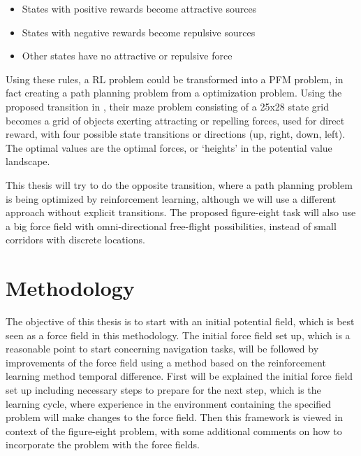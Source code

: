 \documentclass[11pt]{article}
\begin{document}
\begin{itemize}
 \item States with positive rewards become attractive sources
 \item States with negative rewards become repulsive sources
 \item Other states have no attractive or repulsive force
\end{itemize}

Using these rules, a RL problem could be transformed into a PFM problem, in fact creating a path planning problem from a optimization problem. Using the proposed transition in \cite{li-juan08}, their maze problem consisting of a 25x28 state grid becomes a grid of objects exerting attracting or repelling forces, used for direct reward, with four possible state transitions or directions (up, right, down, left). The optimal values are the optimal forces, or `heights' in the potential value landscape.

This thesis will try to do the opposite transition, where a path planning problem is being optimized by reinforcement learning, although we will use a different approach without explicit transitions. The proposed figure-eight task will also use a big force field with omni-directional free-flight possibilities, instead of small corridors with discrete locations.




\section{Methodology}
\label{sec:method}


The objective of this thesis is to start with an initial potential field, which is best seen as a force field in this methodology. The initial force field set up, which is a reasonable point to start concerning navigation tasks, will be followed by improvements of the force field using a method based on the reinforcement learning method temporal difference. First will be explained the initial force field set up including necessary steps to prepare for the next step, which is the learning cycle, where experience in the environment containing the specified problem will make changes to the force field. Then this framework is viewed in context of the figure-eight problem, with some additional comments on how to incorporate the problem with the force fields.
\end{document}
